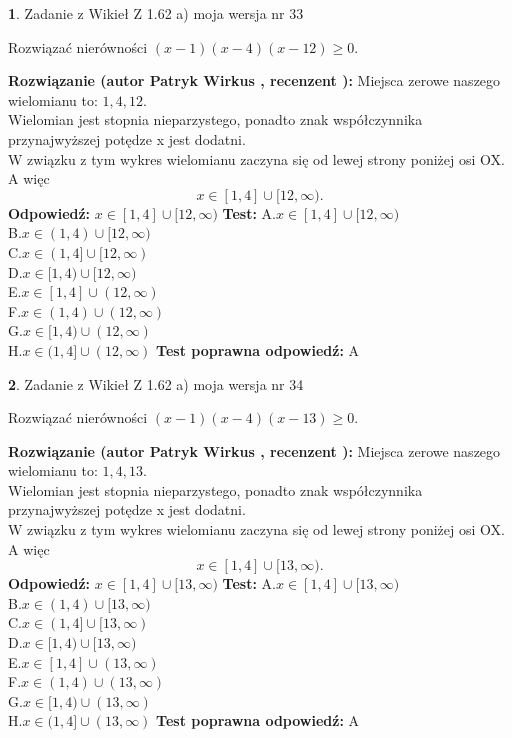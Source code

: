 \documentclass[12pt, a4paper]{article}
\theoremstyle{definition} %
\newtheorem{zad}{}
\newcommand{\zadStart}[1]{\begin{zad}#1\newline}
\newcommand{\zadStop}{\end{zad}}
\newcommand{\rozwStart}[2]{\noindent \textbf{Rozwiązanie (autor #1 , recenzent #2): }\newline}
\newcommand{\rozwStop}{\newline}
\newcommand{\odpStart}{\noindent \textbf{Odpowiedź:}\newline}
\newcommand{\odpStop}{\newline}
\newcommand{\testStart}{\noindent \textbf{Test:}\newline}
\newcommand{\testStop}{\newline}
\newcommand{\kluczStart}{\noindent \textbf{Test poprawna odpowiedź:}\newline}
\newcommand{\kluczStop}{\newline}
\begin{document}
\zadStart{Zadanie z Wikieł Z 1.62 a) moja wersja nr 33}

Rozwiązać nierówności $(x-1)(x-4)(x-12)\ge0$.
\zadStop
\rozwStart{Patryk Wirkus}{}
Miejsca zerowe naszego wielomianu to: $1, 4, 12$.\\
Wielomian jest stopnia nieparzystego, ponadto znak współczynnika przy\linebreak najwyższej potędze x jest dodatni.\\ W związku z tym wykres wielomianu zaczyna się od lewej strony poniżej osi OX. A więc $$x \in [1,4] \cup [12,\infty).$$
\rozwStop
\odpStart
$x \in [1,4] \cup [12,\infty)$
\odpStop
\testStart
A.$x \in [1,4] \cup [12,\infty)$\\
B.$x \in (1,4) \cup [12,\infty)$\\
C.$x \in (1,4] \cup [12,\infty)$\\
D.$x \in [1,4) \cup [12,\infty)$\\
E.$x \in [1,4] \cup (12,\infty)$\\
F.$x \in (1,4) \cup (12,\infty)$\\
G.$x \in [1,4) \cup (12,\infty)$\\
H.$x \in (1,4] \cup (12,\infty)$
\testStop
\kluczStart
A
\kluczStop



\zadStart{Zadanie z Wikieł Z 1.62 a) moja wersja nr 34}

Rozwiązać nierówności $(x-1)(x-4)(x-13)\ge0$.
\zadStop
\rozwStart{Patryk Wirkus}{}
Miejsca zerowe naszego wielomianu to: $1, 4, 13$.\\
Wielomian jest stopnia nieparzystego, ponadto znak współczynnika przy\linebreak najwyższej potędze x jest dodatni.\\ W związku z tym wykres wielomianu zaczyna się od lewej strony poniżej osi OX. A więc $$x \in [1,4] \cup [13,\infty).$$
\rozwStop
\odpStart
$x \in [1,4] \cup [13,\infty)$
\odpStop
\testStart
A.$x \in [1,4] \cup [13,\infty)$\\
B.$x \in (1,4) \cup [13,\infty)$\\
C.$x \in (1,4] \cup [13,\infty)$\\
D.$x \in [1,4) \cup [13,\infty)$\\
E.$x \in [1,4] \cup (13,\infty)$\\
F.$x \in (1,4) \cup (13,\infty)$\\
G.$x \in [1,4) \cup (13,\infty)$\\
H.$x \in (1,4] \cup (13,\infty)$
\testStop
\kluczStart
A
\kluczStop
\end{document}
